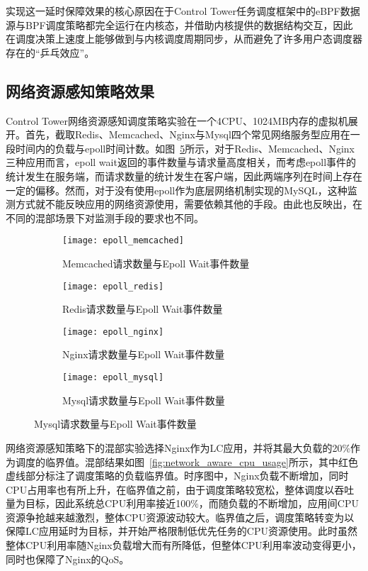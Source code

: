 实现这一延时保障效果的核心原因在于Control Tower任务调度框架中的eBPF数据源与BPF调度策略都完全运行在内核态，并借助内核提供的数据结构交互，因此在调度决策上速度上能够做到与内核调度周期同步，从而避免了许多用户态调度器存在的“乒乓效应”。

\subsection{网络资源感知策略效果}

Control Tower网络资源感知调度策略实验在一个4CPU、1024MB内存的虚拟机展开。首先，截取Redis、Memcached、Nginx与Mysql四个常见网络服务型应用在一段时间内的负载与epoll时间计数。如图~\ref{fig:epoll_request}所示，对于Redis、Memcached、Nginx三种应用而言，epoll wait返回的事件数量与请求量高度相关，而考虑epoll事件的统计发生在服务端，而请求数量的统计发生在客户端，因此两端序列在时间上存在一定的偏移。然而，对于没有使用epoll作为底层网络机制实现的MySQL，这种监测方式就不能反映应用的网络资源使用，需要依赖其他的手段。由此也反映出，在不同的混部场景下对监测手段的要求也不同。

\begin{figure}[!htbp]
    \centering
    \begin{subfigure}[b]{0.49\textwidth}
        \texttt{[image: epoll\_memcached]}
        \caption{Memcached请求数量与Epoll Wait事件数量}
        \label{fig:epoll_memcached}
    \end{subfigure}
    \begin{subfigure}[b]{0.49\textwidth}
        \texttt{[image: epoll\_redis]}
        \caption{Redis请求数量与Epoll Wait事件数量}
        \label{fig:epoll_redis}
    \end{subfigure}
    \begin{subfigure}[b]{0.49\textwidth}
        \texttt{[image: epoll\_nginx]}
        \caption{Nginx请求数量与Epoll Wait事件数量}
        \label{fig:epoll_nginx}
    \end{subfigure}
    \begin{subfigure}[b]{0.49\textwidth}
        \texttt{[image: epoll\_mysql]}
        \caption{Mysql请求数量与Epoll Wait事件数量}
        \label{fig:epoll_mysql}
    \end{subfigure}
\label{fig:epoll_request}
\end{figure}

网络资源感知策略下的混部实验选择Nginx作为LC应用，并将其最大负载的20\%作为调度的临界值。混部结果如图~\ref{fig:network_aware_cpu_usage}所示，其中红色虚线部分标注了调度策略的负载临界值。时序图中，Nginx负载不断增加，同时CPU占用率也有所上升，在临界值之前，由于调度策略较宽松，整体调度以吞吐量为目标，因此系统总CPU利用率接近100\%，而随负载的不断增加，应用间CPU资源争抢越来越激烈，整体CPU资源波动较大。临界值之后，调度策略转变为以保障LC应用延时为目标，并开始严格限制低优先任务的CPU资源使用。此时虽然整体CPU利用率随Nginx负载增大而有所降低，但整体CPU利用率波动变得更小，同时也保障了Nginx的QoS。


